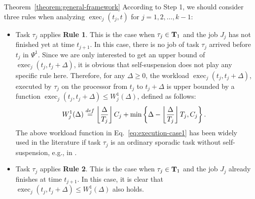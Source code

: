 \begin{appProof}{Theorem~\ref{theorem:general-framework}}
According to Step 1, we should consider three rules when analyzing $\operatorname{exec}_j(t_j, t)$ for $j=1,2,\ldots,k-1$:
\begin{itemize}
\item Task $\tau_j$ applies {\bf Rule 1}. This is the case when
  $\tau_j \in {\bf T}_1$ and the job $J_j$ has not finished yet at
  time $t_{j+1}$. In this case, there is no job of task $\tau_j$
  arrived before $t_j$ in $\Psi^1$.  Since we are only interested to get an upper bound  of $\operatorname{exec}_j(t_j, t_j+\Delta)$, it is obvious that self-suspension does not play any specific rule here. Therefore, for any $\Delta \geq
  0$, the workload $\operatorname{exec}_j(t_j, t_j+\Delta)$, executed by $\tau_j$ on the
  processor from $t_j$ to $t_j+\Delta$ is upper bounded by a function $\operatorname{exec}_j(t_j, t_j+\Delta)  \leq W_j^1(\Delta)$, defined as follows:
{\footnotesize \begin{equation}
  \label{eq:execution-case1}
  W_j^1(\Delta) \stackrel{\mbox{def}}{=} \floor{\frac{\Delta}{T_j}}C_j + \min\left\{\Delta-\floor{\frac{\Delta}{T_j}}T_j, C_j\right\}.
\end{equation}}The above workload function in Eq.~\eqref{eq:execution-case1} has been widely used in the literature if task $\tau_j$ is an ordinary sporadic task without self-suspension, e.g., in \cite{bertogna2006new}.

\item Task $\tau_j$ applies {\bf Rule 2}. This is the case when
  $\tau_j \in {\bf T}_1$ and the job $J_j$ already finishes at time
  $t_{j+1}$. In this case, it is clear that $\operatorname{exec}_j(t_j, t_j+\Delta)  \leq W_j^1(\Delta)$ also holds.


\end{itemize}
\end{appProof}
